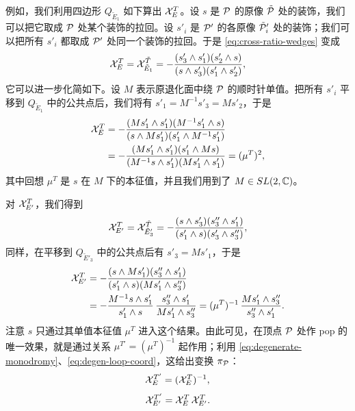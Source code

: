 例如，我们利用四边形 $Q_{\tilde E_1}$ 如下算出 $\mathcal{X}^T_E$。设 $s$ 是 $\mathcal{P}$ 的原像 $\tilde{\mathcal{P}}$ 处的装饰，我们可以把它取成 $\mathcal{P}$ 处某个装饰的拉回。设 $s'_i$ 是 $\mathcal{P}'$ 的各原像 $\tilde{\mathcal{P}}'_i$ 处的装饰；我们可以把所有 $s'_i$ 都取成 $\mathcal{P}'$ 处同一个装饰的拉回。于是 \eqref{eq:cross-ratio-wedges} 变成
\begin{equation}
\mathcal{X}^T_E = \mathcal{X}^{\tilde T}_{\tilde E_1} = -\frac{(s'_3\wedge s'_1)(s'_2\wedge s)}{(s\wedge s'_3)(s'_1\wedge s'_2)},
\end{equation}
它可以进一步化简如下。设 $M$ 表示原退化面中绕 $\mathcal{P}$ 的顺时针单值。把所有 $s'_i$ 平移到 $Q_{\tilde E_1}$ 中的公共点后，我们将有 $s'_1=M^{-1}s'_3=Ms'_2$，于是
\begin{equation}\label{eq:degenerate-monodromy}
\begin{split}
\mathcal{X}^T_E &= -\frac{(Ms'_1\wedge s'_1)(M^{-1}s'_1\wedge s)}{(s\wedge Ms'_1)(s'_1\wedge M^{-1}s'_1)}\\
&= -\frac{(Ms'_1\wedge s'_1)(s'_1\wedge Ms)}{(M^{-1}s\wedge s'_1)(Ms'_1\wedge s'_1)} = (\mu^T)^{2},
\end{split}
\end{equation}
其中回想 $\mu^T$ 是 $s$ 在 $M$ 下的本征值，并且我们用到了 $M\in SL(2,\mathbb{C})$。

对 $\mathcal{X}^T_{E'}$，我们得到
\begin{equation}
\mathcal{X}^T_{E'} = \mathcal{X}^{\tilde T}_{\tilde E'_3} = -\frac{(s\wedge s'_3)(s''_3\wedge s'_1)}{(s'_1\wedge s)(s'_3\wedge s''_3)},
\end{equation}
同样，在平移到 $Q_{\tilde E'_3}$ 中的公共点后有 $s'_3=Ms'_1$，于是
\begin{equation}\label{eq:degen-loop-coord}
\begin{split}
\mathcal{X}^T_{E'} &= -\frac{(s\wedge Ms'_1)(s''_3\wedge s'_1)}{(s'_1\wedge s)(Ms'_1\wedge s''_3)}\\
&= -\frac{M^{-1}s\wedge s'_1}{s'_1\wedge s}\,\frac{s''_3\wedge s'_1}{Ms'_1\wedge s''_3}
= (\mu^T)^{-1}\,\frac{Ms'_1\wedge s''_3}{s''_3\wedge s'_1}.
\end{split}
\end{equation}
注意 $s$ 只通过其单值本征值 $\mu^T$ 进入这个结果。由此可见，在顶点 $\mathcal{P}$ 处作 pop 的唯一效果，就是通过关系 $\mu^{T'}=(\mu^T)^{-1}$ 起作用；利用 \eqref{eq:degenerate-monodromy}、\eqref{eq:degen-loop-coord}，这给出变换 $\pi_{\mathcal{P}}$：
\begin{equation}
\mathcal{X}^{T'}_E = (\mathcal{X}^{T}_E)^{-1},
\end{equation}
\begin{equation}
\mathcal{X}^{T'}_{E'} = \mathcal{X}^T_E\,\mathcal{X}^T_{E'}.
\end{equation}

